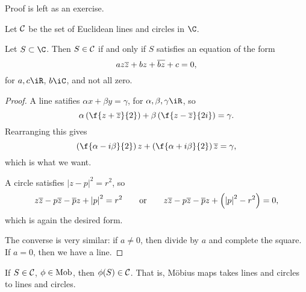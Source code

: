 \vspace{-6pt}

Proof is left as an exercise.

\begin{definition}
	Let $\cal{C}$ be the set of Euclidean lines and circles in $\C$.
\end{definition}

\begin{lemma}
	Let $S\subset\C$. Then $S\in\cal{C}$ if and only if $S$ satisfies an equation of the form \label{lem:eq-lines-circles}
	\begin{equation*}
		az\overline{z} + bz+\overline{bz}+c=0,
	\end{equation*}
	for $a,c\iR$, $b\iC$, and not all zero.
\end{lemma}

\begin{proof}
	A line satifies $\alpha x+\beta y = \gamma$, for $\alpha,\beta,\gamma\iR$, so
	\begin{equation*}
		\alpha\left( \f{z+\zbar}{2} \right) + \beta\left( \f{z-\zbar}{2i} \right) = \gamma.
	\end{equation*}
	Rearranging this gives
	\begin{equation*}
		\left( \f{\alpha-i\beta}{2} \right)z + \left( \f{\alpha+i\beta}{2} \right)\zbar = \gamma,
	\end{equation*}
	which is what we want.

	A circle satisfies $\left\vert z-p \right\vert^2=r^2$, so
	\begin{equation*}
		z\overline{z}-p\overline{z}-\overline{p}z+\left\vert p \right\vert^2 = r^2 \qquad \text{or} \qquad
		z\overline{z}-p\overline{z}-\overline{p}z+\left( \left\vert p \right\vert^2-r^2 \right) = 0,
	\end{equation*}
	which is again the desired form.

	The converse is very similar: if $a\neq 0$, then divide by $a$ and complete the square. If $a=0$, then we have a line. 
\end{proof}

\begin{corollary}
	If $S\in\cal{C}$, $\phi\in\operatorname{Mob}$, then $\phi(S)\in\cal{C}$. That is, Möbius maps takes lines and circles to lines and circles.
\end{corollary}

